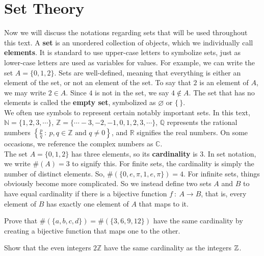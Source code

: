 \clearpage

\section{Set Theory}
Now we will discuss the notations regarding sets that will be used throughout this text. A \textbf{set} is an unordered collection of objects, which we individually call \textbf{elements}.  It is standard to use upper-case letters to symbolize sets, just as lower-case letters are used as variables for values. For example, we can write the set $A=\{0, 1, 2\}$. Sets are well-defined, meaning that everything is either an element of the set, or not an element of the set. To say that $2$ is an element of $A$, we may write $2\in A$. Since $4$ is not in the set, we say $4\notin A$. The set that has no elements is called the \textbf{empty set}, symbolized as $\varnothing$ or $\{\, \}$.\\

We often use symbols to represent certain notably important sets. In this text, $\mathbb{N}=\{1,2,3,\cdots\}$, $\mathbb{Z}=\{\cdots -3, -2, -1, 0, 1,2,3,\cdots\}$, $\mathbb{Q}$ represents the rational numbers $\left\{\frac{p}{q}\ :\ p,q\in\mathbb{Z}\text{ and } q\neq 0\right\}$, and $\mathbb{R}$ signifies the real numbers. On some occasions, we reference the complex numbers as $\mathbb{C}$. \\

The set $A=\{0,1,2\}$ has three elements, so its \textbf{cardinality} is 3. In set notation, we write $\#(A)=3$ to signify this. For finite sets, the cardinality is simply the number of distinct elements. So, $\#(\{0,e,\pi,1,e,\pi\})=4$. For infinite sets, things obviously become more complicated. So we instead define two sets $A$ and $B$ to have equal cardinality if there is a bijective function $f\ :\ A\to B$, that is, every element of $B$ has exactly one element of $A$ that maps to it. \\

\begin{exercise}
    Prove that $\#(\{a,b,c,d\})  = \#(\{3,6,9,12\})$ have the same cardinality by creating a bijective function that maps one to the other. 
\end{exercise}
\vspace{-5mm}
\begin{exercise}
    Show that the even integers $2\mathbb{Z}$ have the same cardinality as the integers $\mathbb{Z}$. 
\end{exercise}

